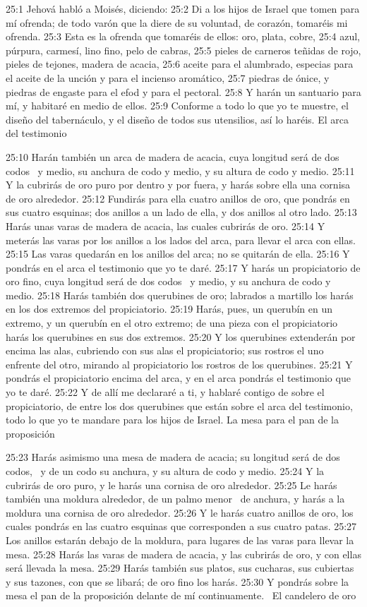 25:1 Jehová habló a Moisés, diciendo: 
25:2 Di a los hijos de Israel que tomen para mí ofrenda; de todo varón que la diere de su voluntad, de corazón, tomaréis mi ofrenda. 
25:3 Esta es la ofrenda que tomaréis de ellos: oro, plata, cobre, 
25:4 azul, púrpura, carmesí, lino fino, pelo de cabras, 
25:5 pieles de carneros teñidas de rojo, pieles de tejones, madera de acacia, 
25:6 aceite para el alumbrado, especias para el aceite de la unción y para el incienso aromático, 
25:7 piedras de ónice, y piedras de engaste para el efod y para el pectoral. 
25:8 Y harán un santuario para mí, y habitaré en medio de ellos. 
25:9 Conforme a todo lo que yo te muestre, el diseño del tabernáculo, y el diseño de todos sus utensilios, así lo haréis. 
El arca del testimonio 

25:10 Harán también un arca de madera de acacia, cuya longitud será de dos codos  y medio, su anchura de codo y medio, y su altura de codo y medio. 
25:11 Y la cubrirás de oro puro por dentro y por fuera, y harás sobre ella una cornisa de oro alrededor. 
25:12 Fundirás para ella cuatro anillos de oro, que pondrás en sus cuatro esquinas; dos anillos a un lado de ella, y dos anillos al otro lado. 
25:13 Harás unas varas de madera de acacia, las cuales cubrirás de oro. 
25:14 Y meterás las varas por los anillos a los lados del arca, para llevar el arca con ellas. 
25:15 Las varas quedarán en los anillos del arca; no se quitarán de ella. 
25:16 Y pondrás en el arca el testimonio que yo te daré. 
25:17 Y harás un propiciatorio de oro fino, cuya longitud será de dos codos  y medio, y su anchura de codo y medio. 
25:18 Harás también dos querubines de oro; labrados a martillo los harás en los dos extremos del propiciatorio. 
25:19 Harás, pues, un querubín en un extremo, y un querubín en el otro extremo; de una pieza con el propiciatorio harás los querubines en sus dos extremos. 
25:20 Y los querubines extenderán por encima las alas, cubriendo con sus alas el propiciatorio; sus rostros el uno enfrente del otro, mirando al propiciatorio los rostros de los querubines. 
25:21 Y pondrás el propiciatorio encima del arca, y en el arca pondrás el testimonio que yo te daré. 
25:22 Y de allí me declararé a ti, y hablaré contigo de sobre el propiciatorio, de entre los dos querubines que están sobre el arca del testimonio, todo lo que yo te mandare para los hijos de Israel. 
La mesa para el pan de la proposición 

25:23 Harás asimismo una mesa de madera de acacia; su longitud será de dos codos,  y de un codo su anchura, y su altura de codo y medio. 
25:24 Y la cubrirás de oro puro, y le harás una cornisa de oro alrededor. 
25:25 Le harás también una moldura alrededor, de un palmo menor  de anchura, y harás a la moldura una cornisa de oro alrededor. 
25:26 Y le harás cuatro anillos de oro, los cuales pondrás en las cuatro esquinas que corresponden a sus cuatro patas. 
25:27 Los anillos estarán debajo de la moldura, para lugares de las varas para llevar la mesa. 
25:28 Harás las varas de madera de acacia, y las cubrirás de oro, y con ellas será llevada la mesa. 
25:29 Harás también sus platos, sus cucharas, sus cubiertas y sus tazones, con que se libará; de oro fino los harás. 
25:30 Y pondrás sobre la mesa el pan de la proposición delante de mí continuamente.  
El candelero de oro 


